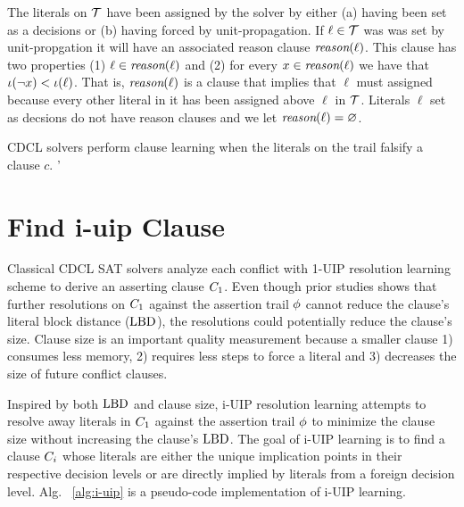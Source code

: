 \documentclass[runningheads]{llncs}
\begin{document}
The literals on $\mathcal{T}$ have been assigned \true by the solver by
either (a) having been set as a decisions or (b) having forced by
unit-propagation. If $\ell\in \mathcal{T}$ was was set by unit-propgation
it will have an associated reason clause $\textit{reason}(\ell)$. This clause
has two properties (1) $\ell\in \textit{reason}(\ell)$ and (2) for every
$x\in \textit{reason}(\ell)$ we have that
$\iota(\lnot x) < \iota(\ell)$. That is, $\textit{reason}(\ell)$ is a
clause that implies that $\ell$ must assigned \true because every
other literal in it has been assigned \false above $\ell$ in
$\mathcal{T}$. Literals $\ell$ set as decsions do not have reason clauses
and we let $\textit{reason}(\ell) = \varnothing$.

CDCL \sat solvers perform clause learning when the literals on the
trail falsify a clause $c$. '

\section{Find i-uip Clause}
\label{sec:i-uip}
Classical CDCL SAT solvers analyze each conflict with 1-UIP resolution
learning scheme to derive an asserting clause $C_{1}$. Even
though prior studies shows that further resolutions on $C_{1}$
against the assertion trail $\phi$ cannot reduce the
clause's literal block distance ($\text{LBD}$), the resolutions could
potentially reduce the clause's size. Clause size is an important
quality measurement because a smaller clause 1) consumes less memory,
2) requires less steps to force a literal and 3) decreases the size of
future conflict clauses.

Inspired by both $\text{LBD}$ and clause size, i-UIP resolution learning
attempts to resolve away literals in $C_{1}$ against the
assertion trail $\phi$ to minimize the clause size without
increasing the clause's $\text{LBD}$. The goal of i-UIP learning is to find
a clause $C_{i}$ whose literals are either the unique
implication points in their respective decision levels or are directly
implied by literals from a foreign decision
level. Alg. ~\ref{alg:i-uip} is a pseudo-code implementation of i-UIP
learning.
\end{document}
